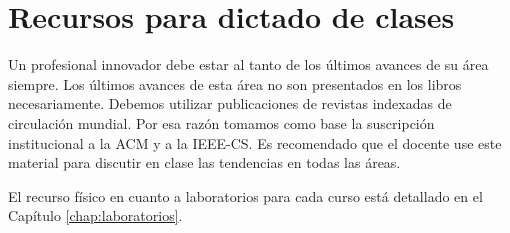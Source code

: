 \section{Recursos para dictado de clases}\label{sec:resources-to-teach}
Un profesional innovador debe estar al tanto de los últimos avances de su área siempre. Los últimos avances de esta área no son presentados en los libros necesariamente. Debemos utilizar publicaciones de revistas indexadas de circulación mundial. Por esa razón tomamos como base la suscripción institucional a la ACM y a la IEEE-CS. Es recomendado que el docente use este material para discutir en clase las tendencias en todas las áreas.

El recurso físico en cuanto a laboratorios para cada curso está detallado en el Capítulo \ref{chap:laboratorios}.
